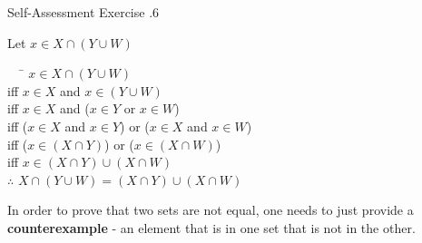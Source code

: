 \documentclass[../notes.tex]{subfiles}
\begin{document}
\begin{exercise}{Self-Assessment Exercise \thechapter.6}
\begin{enumerate}[label=(\alph*)]
						Let $x \in X \cap (Y \cup W)$
						\begin{tabbing}
							$\quad$ \= $x \in X \cap (Y \cup W)$\\
							iff \> $x \in X$ and $x \in (Y \cup W)$\\
							iff \> $x \in X$ and ($x \in Y$ or $x \in W$)\\
							iff \> ($x \in X$ and $x \in Y$) or ($x \in X$ and $x \in W$)\\
							iff \> ($x \in (X \cap Y)$) or ($x \in (X \cap W)$)\\
							iff \> $x \in (X \cap Y) \cup (X \cap W)$\\
							$\therefore$ \> $X \cap (Y \cup W) = (X \cap Y) \cup (X \cap W)$
						\end{tabbing}
				\end{enumerate}
			\end{exercise}
			In order to prove that two sets are not equal, one needs to just provide a \textbf{counterexample} - an element that is in one set that is not in the other.
\end{document}
